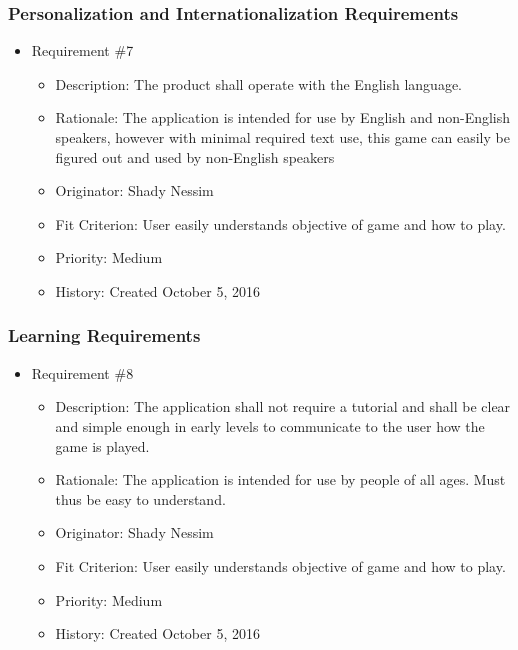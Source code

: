 \documentclass[12pt, titlepage]{article}
\begin{document}
\subsubsection{Personalization and Internationalization Requirements}
\begin{itemize} 

\item Requirement \#7
\begin{itemize} 
\item Description: The product shall operate with the English language. 
\item Rationale: The application is intended for use by English and non-English speakers, however with minimal required text use, this game can easily be figured out and used by non-English speakers
\item Originator: Shady Nessim 
\item Fit Criterion: User easily understands objective of game and how to play. 
\item Priority: Medium 
\item History: Created October 5, 2016
\end{itemize}

\end{itemize}

\subsubsection{Learning Requirements}
\begin{itemize} 

\item Requirement \#8 
\begin{itemize} 
\item Description: The application shall not require a tutorial and shall be clear and simple enough in early levels to communicate to the user how the game is played.
\item Rationale: The application is intended for use by people of all ages. Must thus be easy to understand.
\item Originator: Shady Nessim 
\item Fit Criterion: User easily understands objective of game and how to play. 
\item Priority: Medium 
\item History: Created October 5, 2016
\end{itemize}

\end{itemize}
\end{document}
